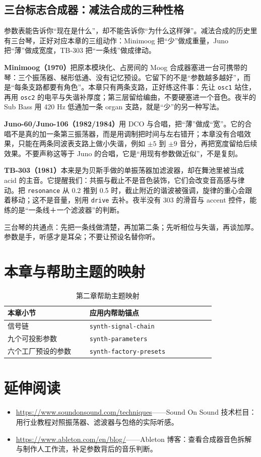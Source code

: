 \subsection{三台标志合成器：减法合成的三种性格}

参数表能告诉你“现在是什么”，却不能告诉你“为什么这样弹”。减法合成的历史里有三台琴，正好对应本章的三组动作：Minimoog 把“少”做成重量，Juno 把“薄”做成宽度，TB-303 把“一条线”做成律动。

\textbf{Minimoog（1970）}把原本模块化、占房间的 Moog 合成器塞进一台可携带的琴：三个振荡器、梯形低通、没有记忆预设。它留下的不是“参数越多越好”，而是“每条支路都要有角色”。本章只有两条支路，正好练这件事：先让 \texttt{osc1} 站住，再用 \texttt{osc2} 的电平与失谐补厚度；第三层留给编曲，不要硬塞进一个音色。夜半的 Sub Bass 用 420 Hz 低通加一条 organ 支路，就是“少”的另一种写法。

\textbf{Juno-60/Juno-106（1982/1984）}用 DCO 与合唱，把“薄”做成“宽”。它的合唱不是真的加一条第三振荡器，而是用调制把时间与左右错开；本章没有合唱效果，只能在两条同波表支路上做小失谐，例如 $\pm5$ 到 $\pm9$ 音分，再把宽度留给后续效果。不要声称这等于 Juno 的合唱，它是“用现有参数做近似”，不是复刻。

\textbf{TB-303（1981）}本来是为贝斯手做的单振荡器加滤波器，却在舞池里被当成 acid 的主音。它提醒我们：共振与截止不是音色装饰，它们会改变音高感与律动。把 \texttt{resonance} 从 0.2 推到 0.5 时，截止附近的谐波被强调，旋律的重心会跟着移动；这不是音量，别用 \texttt{drive} 去补。夜半没有 303 的滑音与 accent 控件，能练的是“一条线＋一个滤波器”的判断。

三台琴的共通点：先把一条线做清楚，再加第二条；先听相位与失谐，再谈加厚。参数是手，听感才是耳朵；不要让预设名替你听。

\section{本章与帮助主题的映射}

\begin{table}[htbp]
\centering
\small
\begin{tabular}{@{}p{0.34\linewidth}p{0.52\linewidth}@{}}
\hline
本章小节 & 应用内帮助锚点 \\
\hline
信号链 & \texttt{synth-signal-chain} \\
九个可投影参数 & \texttt{synth-parameters} \\
六个工厂预设的参数 & \texttt{synth-factory-presets} \\
\hline
\end{tabular}
\caption{第二章帮助主题映射}
\end{table}

\section*{延伸阅读}
\begin{itemize}[leftmargin=1.5em]
\item \url{https://www.soundonsound.com/techniques}——Sound On Sound 技术栏目：用行业教程对照振荡器、滤波器与包络的实际听感。
\item \url{https://www.ableton.com/en/blog/}——Ableton 博客：查看合成器音色拆解与制作人工作流，补足参数背后的音乐判断。
\end{itemize}
